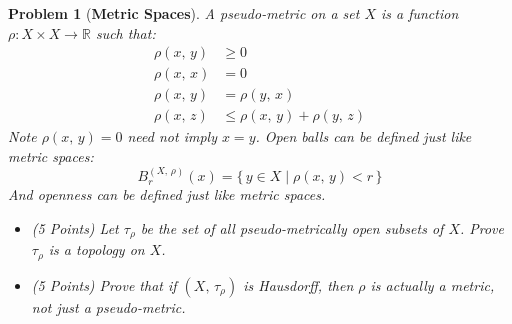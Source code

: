 \documentclass{article}
\theoremstyle{normal}
\newtheorem{problem}{Problem}
\begin{document}
    \newpage
    \color{blue}
    \begin{problem}[\textbf{Metric Spaces}]
        \par\hfill\par
        A pseudo-metric on a set $X$ is a function
        $\rho:X\times{X}\rightarrow\mathbb{R}$ such that:
        \begin{align}
            \rho(x,\,y)&\geq{0}\tag{Positivity}\\
            \rho(x,\,x)&=0\tag{Definite}\\
            \rho(x,\,y)&=\rho(y,\,x)\tag{Symmetry}\\
            \rho(x,\,z)&\leq\rho(x,\,y)+\rho(y,\,z)
                \tag{Triangle-Inequality}
        \end{align}
        Note $\rho(x,\,y)=0$ need not imply $x=y$. Open balls can be defined
        just like metric spaces:
        \begin{equation}
            B_{r}^{(X,\,\rho)}(x)=\{\,y\in{X}\;|\;\rho(x,\,y)<r\,\}
        \end{equation}
        And openness can be defined just like metric spaces.
        \begin{itemize}
            \item (5 Points) Let $\tau_{\rho}$ be the set of all
                pseudo-metrically open subsets of $X$. Prove $\tau_{\rho}$ is
                a topology on $X$.
            \item (5 Points) Prove that if $(X,\,\tau_{\rho})$ is Hausdorff,
                then $\rho$ is actually a metric, not just a pseudo-metric.
        \end{itemize}
    \end{problem}
    \color{black}
\end{document}
